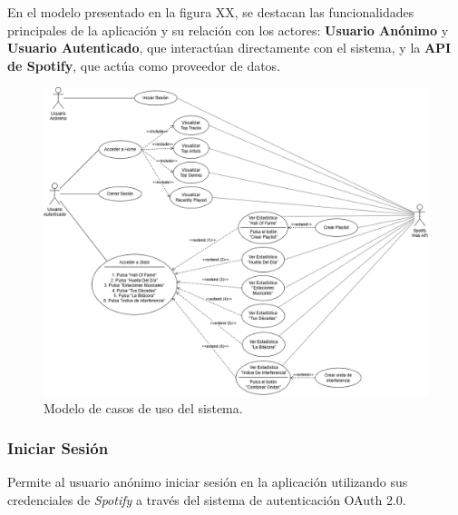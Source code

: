 En el modelo presentado en la figura XX, se destacan las funcionalidades principales de la aplicación y su relación con los actores: \textbf{Usuario Anónimo} y \textbf{Usuario Autenticado}, que interactúan directamente con el sistema, y la \textbf{API de Spotify}, que actúa como proveedor de datos.

\begin{figure}[H]
    \centering
    \includegraphics[width=\textwidth]{figures/modelo_casos_uso.png}
    \caption{Modelo de casos de uso del sistema.}
    \label{fig:modelo_casos_uso}
\end{figure}


\subsubsection*{Iniciar Sesión}

Permite al usuario anónimo iniciar sesión en la aplicación utilizando sus credenciales de \textit{Spotify} a través del sistema de autenticación OAuth 2.0.

